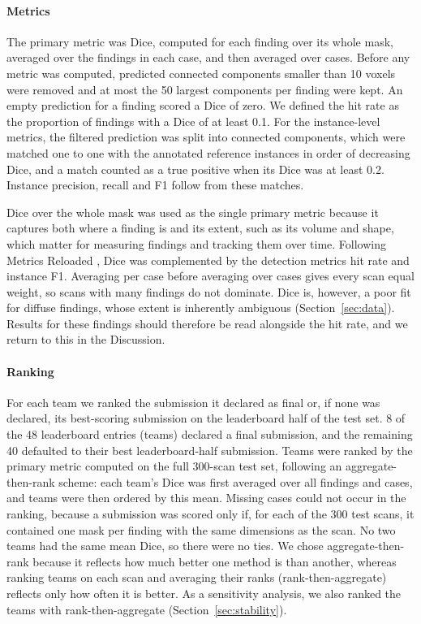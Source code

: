 \documentclass[final,5p,times,twocolumn,authoryear,numafflabel]{elsarticle}
\begin{document}
\paragraph{Metrics}\label{sec:metrics}
The primary metric was Dice, computed for each finding over its whole mask,
averaged over the findings in each case, and then averaged over cases. Before
any metric was computed, predicted connected components smaller than 10
voxels were removed and at most the 50 largest components per finding were
kept. An empty prediction for a finding scored a Dice
of zero. We defined the hit rate as the proportion of findings
with a Dice of at least 0.1. For the instance-level metrics, the filtered
prediction was split into connected components, which were matched one to one
with the annotated reference instances in order of decreasing Dice, and a match counted as a true
positive when its Dice was at least 0.2. Instance precision, recall and F1
follow from these matches.

Dice over the whole mask was used as the single primary metric because it
captures both where a finding is and its extent, such as its volume and shape,
which matter for measuring findings and tracking them over time. Following Metrics Reloaded
\citep{maier2024metrics}, Dice was complemented by the detection metrics hit rate
and instance F1.
Averaging per case before averaging over cases gives every scan equal weight,
so scans with many findings do not dominate. Dice is, however, a poor fit for
diffuse findings, whose extent is inherently ambiguous
(Section~\ref{sec:data}). Results for these findings should therefore be read
alongside the hit rate, and we return to this in the Discussion.

\paragraph{Ranking}
For each team we ranked the submission it declared as final or, if none was
declared, its best-scoring submission on the leaderboard half of the test set.
8 of the 48 leaderboard entries (teams) declared a final
submission, and the remaining 40 defaulted to their best leaderboard-half
submission. Teams were ranked by the primary metric computed on the full
300-scan test set, following an aggregate-then-rank scheme: each
team's Dice was first averaged over all findings and cases, and teams were
then ordered by this mean. Missing cases could not occur in the ranking, because a submission was scored
only if, for each of the 300 test scans, it contained one mask per
finding with the same dimensions as the scan.
No two teams had the same mean Dice, so there were no ties. We chose aggregate-then-rank because it reflects how much better one method is than
another, whereas ranking teams on each scan and averaging their ranks
(rank-then-aggregate) reflects only how often it is better. As a sensitivity analysis, we also ranked
the teams with rank-then-aggregate (Section~\ref{sec:stability}).
\end{document}
